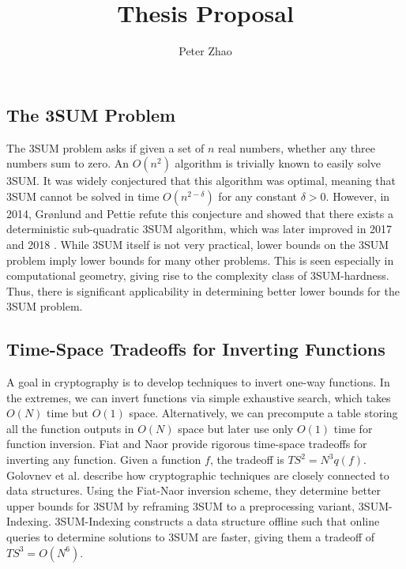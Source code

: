 \documentclass[12pt]{article}
\begin{document}
 
 
 
\title{\vspace{-2cm}Thesis Proposal}%
\author{Peter Zhao} 
\date{\vspace{-1cm}}
\maketitle

\subsection*{The 3SUM Problem}
The 3SUM problem asks if given a set of $n$ real numbers, whether any three numbers sum to zero. An $O(n^2)$ algorithm is trivially known to easily solve 3SUM. It was widely conjectured that this algorithm was optimal, meaning that 3SUM cannot be solved in time $O(n^{2-\delta})$ for any constant $\delta > 0$. However, in 2014, Grønlund and Pettie \cite{gronlund2014threesomes} refute this conjecture and showed that there exists a deterministic sub-quadratic 3SUM algorithm, which was later improved in 2017 \cite{gold2015improved} and 2018 \cite{kane2019near}. While 3SUM itself is not very practical, lower bounds on the 3SUM problem imply lower bounds for many other problems. This is seen especially in computational geometry, giving rise to the complexity class of 3SUM-hardness. Thus, there is significant applicability in determining better lower bounds for the 3SUM problem.

\subsection*{Time-Space Tradeoffs for Inverting Functions}
A goal in cryptography is to develop techniques to invert one-way functions. In the extremes, we can invert functions via simple exhaustive search, which takes $O(N)$ time but $O(1)$ space. Alternatively, we can precompute a table storing all the function outputs in $O(N)$ space but later use only $O(1)$ time for function inversion. Fiat and Naor \cite{fiat1991rigorous} provide rigorous time-space tradeoffs for inverting any function. Given a function $f$, the tradeoff is $TS^2 = N^3q(f)$. Golovnev et al. \cite{golovnev2020data} describe how cryptographic techniques are closely connected to data structures. Using the Fiat-Naor inversion scheme, they determine better upper bounds for 3SUM by reframing 3SUM to a preprocessing variant, 3SUM-Indexing. 3SUM-Indexing constructs a data structure offline such that online queries to determine solutions to 3SUM are faster, giving them a tradeoff of $TS^3 = O(N^6)$.
\end{document}
